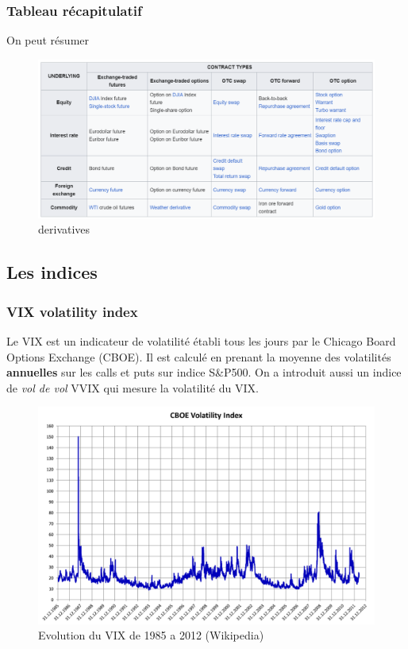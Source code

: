 \documentclass[a4paper]{article}
\begin{document}
\subsubsection{Tableau récapitulatif}
On peut résumer 


\begin{figure}[h!]
\centerline{\includegraphics[scale=0.6]{figures/tableau derivaives.png}}
\caption{derivatives}
\end{figure}

\subsection{Les indices}

\subsubsection{VIX volatility index}

Le VIX est un indicateur de volatilité établi tous les jours par le Chicago Board Options Exchange (CBOE). Il est calculé en prenant la moyenne des volatilités \textbf{annuelles} sur les calls et puts sur indice S\&P500. On a introduit aussi un indice de \textit{vol de vol} VVIX qui mesure la volatilité du VIX.

\begin{figure}[H]
    \centering
    \includegraphics[scale=0.15]{figures/vix.png}
    \caption{Evolution du VIX de 1985 a 2012 (Wikipedia)}
    \label{fig:enter-label}
\end{figure}
\end{document}
